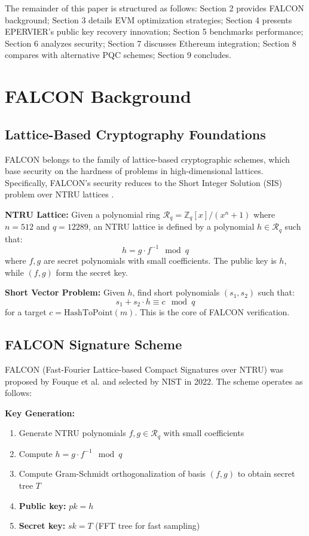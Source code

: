 \documentclass[11pt,a4paper]{article}
\begin{document}
The remainder of this paper is structured as follows: Section 2 provides FALCON background; Section 3 details EVM optimization strategies; Section 4 presents EPERVIER's public key recovery innovation; Section 5 benchmarks performance; Section 6 analyzes security; Section 7 discusses Ethereum integration; Section 8 compares with alternative PQC schemes; Section 9 concludes.

\section{FALCON Background}

\subsection{Lattice-Based Cryptography Foundations}

FALCON belongs to the family of lattice-based cryptographic schemes, which base security on the hardness of problems in high-dimensional lattices. Specifically, FALCON's security reduces to the Short Integer Solution (SIS) problem over NTRU lattices \cite{prest2017sharper}.

\textbf{NTRU Lattice:} Given a polynomial ring $\mathcal{R}_q = \mathbb{Z}_q[x]/(x^n + 1)$ where $n = 512$ and $q = 12289$, an NTRU lattice is defined by a polynomial $h \in \mathcal{R}_q$ such that:
\begin{equation}
h = g \cdot f^{-1} \mod q
\end{equation}
where $f, g$ are secret polynomials with small coefficients. The public key is $h$, while $(f, g)$ form the secret key.

\textbf{Short Vector Problem:} Given $h$, find short polynomials $(s_1, s_2)$ such that:
\begin{equation}
s_1 + s_2 \cdot h \equiv c \mod q
\end{equation}
for a target $c = \text{HashToPoint}(m)$. This is the core of FALCON verification.

\subsection{FALCON Signature Scheme}

FALCON (Fast-Fourier Lattice-based Compact Signatures over NTRU) was proposed by Fouque et al. \cite{falcon2020} and selected by NIST in 2022. The scheme operates as follows:

\textbf{Key Generation:}
\begin{enumerate}
    \item Generate NTRU polynomials $f, g \in \mathcal{R}_q$ with small coefficients
    \item Compute $h = g \cdot f^{-1} \mod q$
    \item Compute Gram-Schmidt orthogonalization of basis $(f, g)$ to obtain secret tree $T$
    \item \textbf{Public key:} $pk = h$
    \item \textbf{Secret key:} $sk = T$ (FFT tree for fast sampling)
\end{enumerate}
\end{document}

